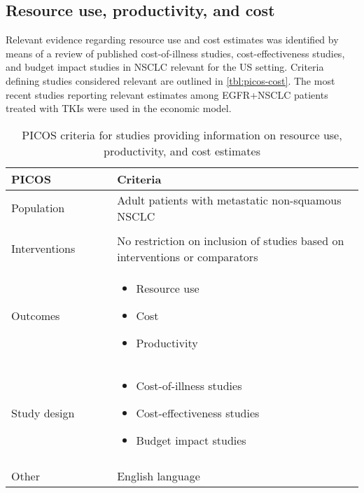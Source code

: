 \documentclass[11pt,final,fleqn]{article}\usepackage[]{graphicx}\usepackage[]{color}
\theoremstyle{plain}
\begin{document}
\begin{appendices}
\FloatBarrier

\subsection{Resource use, productivity, and cost}
Relevant evidence regarding resource use and cost estimates was identified by means of a review of published cost-of-illness studies, cost-effectiveness studies, and budget impact studies in NSCLC relevant for the US setting. Criteria defining studies considered relevant are outlined in \autoref{tbl:picos-cost}. The most recent studies reporting relevant estimates among EGFR+NSCLC patients treated with TKIs were used in the economic model.

\begin{table}[!ht]
\begin{center}
\begin{threeparttable}
\caption{PICOS criteria for studies providing information on resource use, productivity, and cost estimates} \label{tbl:picos-cost}
\begin{tabular}{p{0.3\linewidth}p{0.7\linewidth}}
\hline
\multicolumn{1}{l}{PICOS} &  \multicolumn{1}{l}{Criteria}\\
\hline
Population & Adult patients with metastatic non-squamous NSCLC\\
&\\
Interventions & No restriction on inclusion of studies based on interventions or comparators\\
Outcomes & 
\begin{itemize}
\item Resource use
\item Cost
\item Productivity
\end{itemize} \\
Study design &  
\begin{itemize}
\item Cost-of-illness studies
\item Cost-effectiveness studies
\item Budget impact studies
\end{itemize} \\
&\\
Other & 
English language\\
\hline
\end{tabular}
\end{threeparttable}
\end{center}
\end{table}


\end{appendices}
\end{document}
